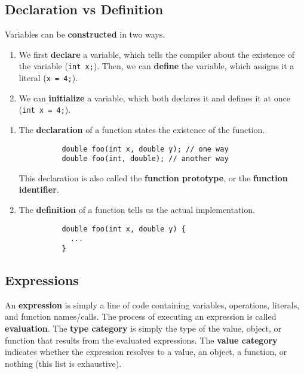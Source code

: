 \documentclass{article}
\begin{document}
  \subsection{Declaration vs Definition} 

    Variables can be \textbf{constructed} in two ways. 
    \begin{enumerate}
      \item We first \textbf{declare} a variable, which tells the compiler about the existence of the variable (\texttt{int x;}). Then, we can \textbf{define} the variable, which assigns it a literal (\texttt{x = 4;}). 
      \item We can \textbf{initialize} a variable, which both declares it and defines it at once (\texttt{int x = 4;}).
    \end{enumerate}

    \begin{enumerate}
      \item The \textbf{declaration} of a function states the existence of the function. 
        \begin{lstlisting}
          double foo(int x, double y); // one way 
          double foo(int, double); // another way 
        \end{lstlisting}
        This declaration is also called the \textbf{function prototype}, or the \textbf{function identifier}. 

      \item The \textbf{definition} of a function tells us the actual implementation. 
        \begin{lstlisting}
          double foo(int x, double y) {
            ...
          }
        \end{lstlisting}
    \end{enumerate}

  \subsection{Expressions}

    \begin{definition}[Expression]
      An \textbf{expression} is simply a line of code containing variables, operations, literals, and function names/calls. The process of executing an expression is called \textbf{evaluation}. The \textbf{type category} is simply the type of the value, object, or function that results from the evaluated expressions. The \textbf{value category} indicates whether the expression resolves to a value, an object, a function, or nothing (this list is exhaustive). 
    \end{definition}
\end{document}
